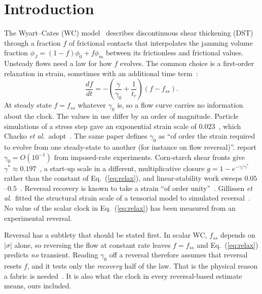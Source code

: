\documentclass[aps,pre,reprint,superscriptaddress,nofootinbib]{revtex4-2}
\begin{document}
\section{Introduction}

The Wyart--Cates (WC) model~\cite{WyartCates2014} describes discontinuous shear thickening
(DST) through a fraction $f$ of frictional contacts that interpolates the jamming volume
fraction $\phi_J=(1-f)\phi_0+f\phi_m$ between its frictionless and frictional values.
Unsteady flows need a law for how $f$ evolves. The common choice is a first-order relaxation
in strain, sometimes with an additional time term~\cite{Mari2015,Chacko2018,Richards2019}:
\begin{equation}
\frac{df}{dt}=-\left(\frac{\dot\gamma}{\gamma_0}+\frac{1}{t_r}\right)\left(f-f_{ss}\right).
\label{eq:relax}
\end{equation}
At steady state $f=f_{ss}$ whatever $\gamma_0$ is, so a flow curve carries no information about the clock.
The values in use differ by an order of magnitude. Particle simulations of a stress step
gave an exponential strain scale of $0.023$~\cite{Mari2015}, which Chacko \emph{et al.}\
adopt~\cite{Chacko2018}. The same paper defines $\gamma_0$ as ``of order the strain required
to evolve from one steady-state to another (for instance on flow reversal)''.
\citet{Richards2019} report $\gamma_0=O(10^{-1})$ from imposed-rate experiments.
Corn-starch shear fronts give $\gamma^*\approx0.197$~\cite{Han2018}, a start-up scale in a different, multiplicative closure $g=1-e^{-\gamma/\gamma^*}$ rather than the constant of Eq.~(\ref{eq:relax}), and
linear-stability work sweeps $0.05$--$0.5$~\cite{DarboisTexier2023}.
Reversal recovery is known to take a strain ``of order unity''~\cite{Lin2015,NessSun2016}.
Gillissen \emph{et al.}\ fitted the structural strain scale of a tensorial model to
simulated reversal~\cite{Gillissen2019}. No value of the scalar clock in
Eq.~(\ref{eq:relax}) has been measured from an experimental reversal.

Reversal has a subtlety that should be stated first. In scalar WC, $f_{ss}$ depends on
$|\sigma|$ alone, so reversing the flow at constant rate leaves $f=f_{ss}$ and
Eq.~(\ref{eq:relax}) predicts \emph{no} transient. Reading $\gamma_0$ off a reversal
therefore assumes that reversal resets $f$, and it tests only the \emph{recovery} half of
the law. That is the physical reason a fabric is needed~\cite{Gillissen2019}. It is also what
the clock in every reversal-based estimate means, ours included.
\end{document}
